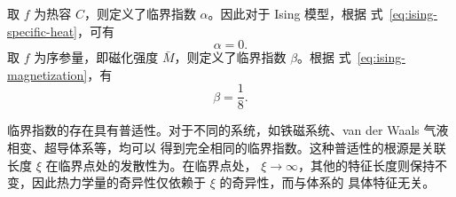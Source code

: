 取 $f$ 为热容 $C$，则定义了临界指数 $\alpha$。因此对于 Ising 模型，根据
式~\eqref{eq:ising-specific-heat}，可有
\begin{equation}
  \alpha = 0.
\end{equation}
取 $f$ 为序参量，即磁化强度 $\bar{M}$，则定义了临界指数 $\beta$。根据
式~\eqref{eq:ising-magnetization}，有
\begin{equation}
  \beta = \frac{1}{8}.
\end{equation}

临界指数的存在具有普适性。对于不同的系统，如铁磁系统、van der Waals 气液相变、超导体系等，均可以
得到完全相同的临界指数。这种普适性的根源是关联长度 $\xi$ 在临界点处的发散性为。在临界点处，
$\xi\to\infty$，其他的特征长度则保持不变，因此热力学量的奇异性仅依赖于 $\xi$ 的奇异性，而与体系的
具体特征无关。

%
